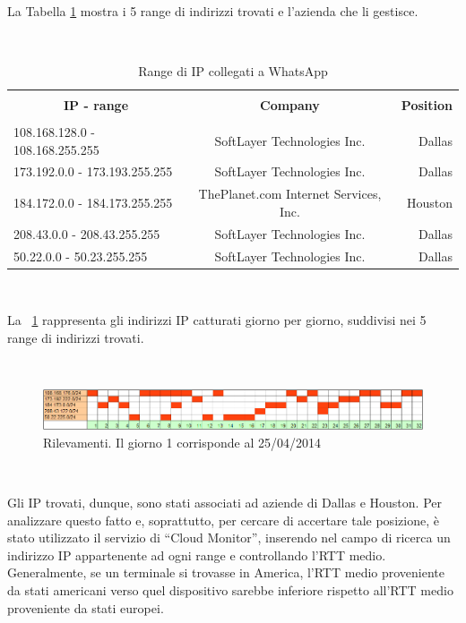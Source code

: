 \documentclass[a4paper,11pt]{book}
\begin{document}
~

La Tabella \ref{table:ip} mostra i 5 range di indirizzi trovati e l'azienda che li gestisce.

~

\begin{table}[!htb]
\caption{Range di IP collegati a WhatsApp}\label{table:ip}
\begin{tabular}{|l|c|r|}
\hline
\multicolumn{1}{|c|}{\textbf{}} & {\textbf{}} & {\textbf{}}\\
\multicolumn{1}{|c|}{\textbf{IP - range}} & {\textbf{Company}} & {\textbf{Position}}\\
\multicolumn{1}{|c|}{\textbf{}} & {\textbf{}} & {\textbf{}}\\
\hline
108.168.128.0 - 108.168.255.255 &  SoftLayer Technologies Inc. & Dallas\\
173.192.0.0 - 173.193.255.255 &  SoftLayer Technologies Inc. & Dallas\\
184.172.0.0 - 184.173.255.255 &  ThePlanet.com Internet Services, Inc. & Houston\\
208.43.0.0 - 208.43.255.255 &  SoftLayer Technologies Inc. & Dallas\\
50.22.0.0 - 50.23.255.255 &  SoftLayer Technologies Inc. & Dallas\\
\hline
\end{tabular}
\end{table}


~

La \figurename ~\ref{fig:rilevazioni_bis} rappresenta gli indirizzi IP catturati giorno per giorno, suddivisi nei 5 range di indirizzi trovati.

~

\begin{figure}[!ht]
\centering
\includegraphics[scale = 0.7]{rilevazioni_30gg2.png}
\caption{Rilevamenti. Il giorno 1 corrisponde al 25/04/2014}
\label{fig:rilevazioni_bis}
\end{figure}

~


Gli IP trovati, dunque, sono stati associati ad aziende di Dallas e Houston. 
Per analizzare questo fatto e, soprattutto, per cercare di accertare tale posizione, \`e stato utilizzato il servizio di ``Cloud Monitor'', inserendo nel campo di ricerca un indirizzo IP appartenente ad ogni range e controllando l'RTT medio. 
Generalmente, se un terminale si trovasse in America, l'RTT medio proveniente da stati americani verso quel dispositivo sarebbe inferiore rispetto all'RTT medio proveniente da stati europei.
\end{document}
